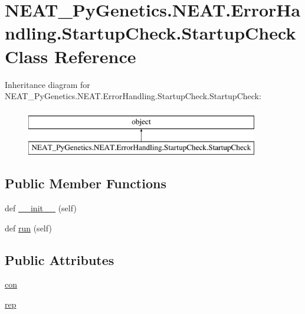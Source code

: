 \hypertarget{classNEAT__PyGenetics_1_1NEAT_1_1ErrorHandling_1_1StartupCheck_1_1StartupCheck}{}\section{N\+E\+A\+T\+\_\+\+Py\+Genetics.\+N\+E\+A\+T.\+Error\+Handling.\+Startup\+Check.\+Startup\+Check Class Reference}
\label{classNEAT__PyGenetics_1_1NEAT_1_1ErrorHandling_1_1StartupCheck_1_1StartupCheck}
Inheritance diagram for N\+E\+A\+T\+\_\+\+Py\+Genetics.\+N\+E\+A\+T.\+Error\+Handling.\+Startup\+Check.\+Startup\+Check\+:\begin{figure}[H]
\begin{center}
\leavevmode
\includegraphics[height=2.000000cm]{classNEAT__PyGenetics_1_1NEAT_1_1ErrorHandling_1_1StartupCheck_1_1StartupCheck}
\end{center}
\end{figure}
\subsection*{Public Member Functions}
\begin{DoxyCompactItemize}
\item 
def \hyperlink{classNEAT__PyGenetics_1_1NEAT_1_1ErrorHandling_1_1StartupCheck_1_1StartupCheck_a1e599ee38990fc5249559baf65685459}{\+\_\+\+\_\+init\+\_\+\+\_\+} (self)
\item 
def \hyperlink{classNEAT__PyGenetics_1_1NEAT_1_1ErrorHandling_1_1StartupCheck_1_1StartupCheck_a03356f117dc673d35d69882ecabad2a3}{run} (self)
\end{DoxyCompactItemize}
\subsection*{Public Attributes}
\begin{DoxyCompactItemize}
\item 
\hyperlink{classNEAT__PyGenetics_1_1NEAT_1_1ErrorHandling_1_1StartupCheck_1_1StartupCheck_afca8d845c7a7796c0963e0d49ec96786}{con}
\item 
\hyperlink{classNEAT__PyGenetics_1_1NEAT_1_1ErrorHandling_1_1StartupCheck_1_1StartupCheck_a9defc0bb9535a560af330658f89337ac}{rep}
\end{DoxyCompactItemize}


